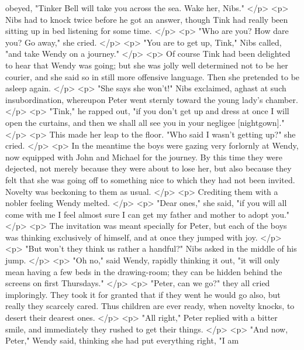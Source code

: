       obeyed, "Tinker Bell will take you across the sea. Wake her, Nibs."
    </p>
    <p>
      Nibs had to knock twice before he got an answer, though Tink had really
      been sitting up in bed listening for some time.
    </p>
    <p>
      "Who are you? How dare you? Go away," she cried.
    </p>
    <p>
      "You are to get up, Tink," Nibs called, "and take Wendy on a journey."
    </p>
    <p>
      Of course Tink had been delighted to hear that Wendy was going; but she
      was jolly well determined not to be her courier, and she said so in still
      more offensive language. Then she pretended to be asleep again.
    </p>
    <p>
      "She says she won't!" Nibs exclaimed, aghast at such insubordination,
      whereupon Peter went sternly toward the young lady's chamber.
    </p>
    <p>
      "Tink," he rapped out, "if you don't get up and dress at once I will open
      the curtains, and then we shall all see you in your negligee [nightgown]."
    </p>
    <p>
      This made her leap to the floor. "Who said I wasn't getting up?" she
      cried.
    </p>
    <p>
      In the meantime the boys were gazing very forlornly at Wendy, now equipped
      with John and Michael for the journey. By this time they were dejected,
      not merely because they were about to lose her, but also because they felt
      that she was going off to something nice to which they had not been
      invited. Novelty was beckoning to them as usual.
    </p>
    <p>
      Crediting them with a nobler feeling Wendy melted.
    </p>
    <p>
      "Dear ones," she said, "if you will all come with me I feel almost sure I
      can get my father and mother to adopt you."
    </p>
    <p>
      The invitation was meant specially for Peter, but each of the boys was
      thinking exclusively of himself, and at once they jumped with joy.
    </p>
    <p>
      "But won't they think us rather a handful?" Nibs asked in the middle of
      his jump.
    </p>
    <p>
      "Oh no," said Wendy, rapidly thinking it out, "it will only mean having a
      few beds in the drawing-room; they can be hidden behind the screens on
      first Thursdays."
    </p>
    <p>
      "Peter, can we go?" they all cried imploringly. They took it for granted
      that if they went he would go also, but really they scarcely cared. Thus
      children are ever ready, when novelty knocks, to desert their dearest
      ones.
    </p>
    <p>
      "All right," Peter replied with a bitter smile, and immediately they
      rushed to get their things.
    </p>
    <p>
      "And now, Peter," Wendy said, thinking she had put everything right, "I am
